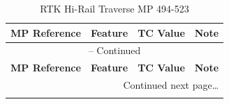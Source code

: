\begin{center}
\begin{longtable}{c l c l}
\caption[RTK Hi-Rail Traverse MP 494-523]{RTK Hi-Rail Traverse MP 494-523}
\label{tab:Hi-RailTraverse} \\
\hline
   \multicolumn{1}{c}{\textbf{MP Reference}} &
   \multicolumn{1}{l}{\textbf{Feature}} &
   \multicolumn{1}{c}{\textbf{TC Value}} &
   \multicolumn{1}{l}{\textbf{Note}} \\
\hline
\endfirsthead

\multicolumn{4}{c}{{\tablename} \thetable{} -- Continued} \\[0.5ex]
\hline
   \multicolumn{1}{c}{\textbf{MP Reference}} &
   \multicolumn{1}{l}{\textbf{Feature}} &
   \multicolumn{1}{c}{\textbf{TC Value}} &
   \multicolumn{1}{l}{\textbf{Note}} \\
\hline
\endhead

\midrule
\multicolumn{4}{r}{{Continued next page\ldots}} \\
\endfoot


\end{longtable}
\end{center}
